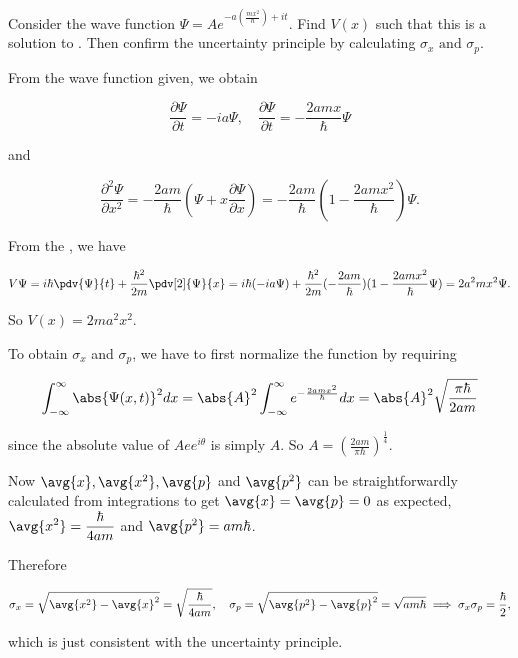 \documentclass[a4paper,12pt]{report}
\begin{document}
{Consider the wave function \(\displaystyle \Psi = Ae^{-a(\frac{mx^2}{\hbar}) + it}\). Find \(V(x)\) such that this is a solution to \screq. Then confirm the uncertainty principle by calculating \(\sigma_x \text { and }  \sigma_p\).}
{From the wave function given, we obtain
			
\begin{equation}
  \frac{\partial \Psi }{\partial t} = -ia\Psi , \quad  \frac{\partial \Psi }{\partial t} = -\frac{2amx}{\hbar }\Psi    
\end{equation}

and
		
\begin{equation}
  \frac{\partial^2 \Psi }{\partial x^2} = -\frac{2am}{\hbar }(\Psi + x\frac{\partial \Psi }{\partial x} ) = -\frac{2am}{\hbar }(1-\frac{2amx^2 }{\hbar } )\Psi .  
\end{equation}
		
From the \screq, we have 
		
\begin{equation}
  V\Psi = i\hbar\pdv{\Psi}{t} + \frac{\hbar^2}{2m}\pdv[2]{\Psi}{x} = i\hbar(-ia\Psi) + \frac{\hbar^2}{2m}(-\frac{2am}{\hbar})(1-\frac{2amx^2}{\hbar}\Psi) = 2a^2mx^2\Psi.
\end{equation}
		
		
So \(V(x) = 2ma^2x^2\).
		
To obtain \(\sigma_x\) and \(\sigma_p\), we have to first normalize the function by requiring

\begin{equation}
  \int_{-\infty}^{\infty} \abs{\Psi (x,t)}^2 dx = \abs{A} ^2  \int_{-\infty}^{\infty} e^{-\frac{2amx^2 }{\hbar } } dx = \abs{A} ^2 \sqrt{\frac{\pi \hbar }{2am} }     
\end{equation}

since the absolute value of \(Aee^{i \theta }\) is simply \(A\). So \(\displaystyle A = (\frac{2am}{\pi\hbar})^{\frac{1}{4} }\).
		
Now \(\avg{x}, \avg{x^2}, \avg{p}\) and \(\avg{p^2}\) can be straightforwardly calculated from integrations to get \(\avg{x} = \avg{p} = 0\) as expected, \( \displaystyle \avg{x^2} = \frac{\hbar}{4am}\) and \(\avg{p^2} = am\hbar\).
		
Therefore 

\begin{equation}
  \sigma_x = \sqrt{\avg{x^2} - \avg{x}^2} = \sqrt{\frac{\hbar}{4am}}, \quad \sigma _{p} = \sqrt{\avg{p^2}-\avg{p}^2  } = \sqrt{am \hbar } \implies \sigma _{x}\sigma _{p} = \frac{\hbar }{2},       
\end{equation}

which is just consistent with the uncertainty principle.}
\end{document}
